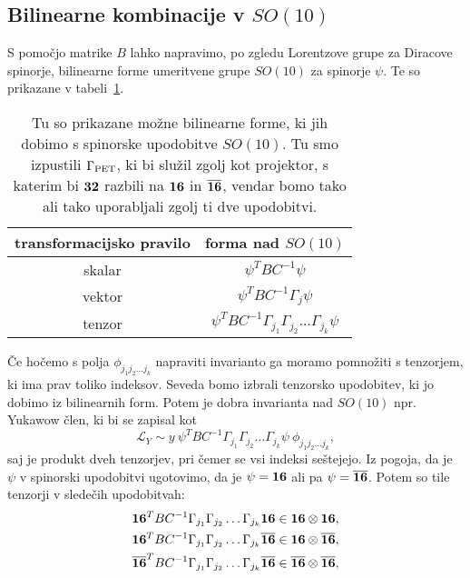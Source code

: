 \subsection{Bilinearne kombinacije v $SO(10)$}

S pomočjo matrike $B$ lahko napravimo, po zgledu Lorentzove grupe za Diracove spinorje, bilinearne forme
umeritvene grupe $SO(10)$ za spinorje $\psi$. Te so prikazane v tabeli~\ref{bilinearne}.
\begin{table}[H]\centering
	\caption{Tu so prikazane možne bilinearne forme, ki jih dobimo s spinorske upodobitve $SO(10)$.
		Tu smo izpustili $\Gamma_{\text{PET}}$, ki bi služil zgolj kot projektor, s katerim bi $\mathbf{32}$ razbili
		na $\mathbf{16}$ in $\overline{\mathbf{16}}$, vendar bomo tako ali tako uporabljali zgolj ti dve upodobitvi.}
	\begin{tabular}{c c}
		transformacijsko pravilo & forma nad $SO(10)$ \\
		\hline
		skalar	& $\psi^T BC^{-1}\psi$ \\
		vektor & $\psi^TBC^{-1}\Gamma_j\psi$ \\
		tenzor & $\psi^TBC^{-1}\Gamma_{j_1}\Gamma_{j_2}\dots\Gamma_{j_k}\psi$
	\end{tabular}
	\label{bilinearne}
\end{table}
Če hočemo s polja $\phi_{j_1j_2\dots j_k}$ napraviti invarianto ga moramo pomnožiti s tenzorjem, ki
ima prav toliko indeksov. Seveda bomo izbrali tenzorsko upodobitev, ki jo dobimo iz bilinearnih
form. Potem je dobra invarianta nad $SO(10)$ npr. Yukawow člen, ki bi se zapisal kot
\begin{equation}
	\mathcal{L}_Y \sim y\ \psi^TBC^{-1}\Gamma_{j_1}\Gamma_{j_2}\dots\Gamma_{j_k}\psi\ 
		\phi_{j_1j_2\dots j_k},
\end{equation}
saj je produkt dveh tenzorjev, pri čemer se vsi indeksi seštejejo. Iz pogoja, da je $\psi$
v spinorski upodobitvi ugotovimo, da je $\psi = \mathbf{16}$ ali pa $\psi = \overline{\mathbf{16}}$. Potem
so tile tenzorji v sledečih upodobitvah:
\begin{align}
	\mathbf{16}^TBC^{-1}\Gamma_{j_1}\Gamma_{j_2}\dots\Gamma_{j_k}\mathbf{16} &\in \mathbf{16}\otimes\mathbf{16},
		\notag \\
	\mathbf{16}^TBC^{-1}\Gamma_{j_1}\Gamma_{j_2}\dots\Gamma_{j_k}\overline{\mathbf{16}} &\in \mathbf{16}\otimes\overline{\mathbf{16}},
		\notag \\
	\overline{\mathbf{16}}^TBC^{-1}\Gamma_{j_1}\Gamma_{j_2}\dots\Gamma_{j_k}\overline{\mathbf{16}} &\in \overline{\mathbf{16}}\otimes\overline{\mathbf{16}},
		\notag \\
\end{align}
